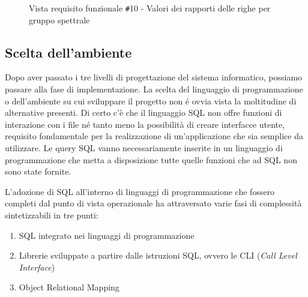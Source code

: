 \documentclass[12pt,a4paper,onecolumn,x11names]{article}
\begin{document}
\begin{figure}[h!]
		\caption{Vista requisito funzionale \texttt{\#}10 - Valori dei rapporti delle righe per gruppo spettrale}
	\end{figure}
\clearpage
\subsection{Scelta dell'ambiente}
		\begin{flushleft}
			Dopo aver passato i tre livelli di progettazione del sistema informatico, possiamo passare alla fase di implementazione. La scelta del linguaggio di programmazione o dell'ambiente su cui sviluppare il progetto non \'{e} ovvia vista la moltitudine di alternative presenti. \newline
			Di certo c'è che il linguaggio SQL non offre funzioni di interazione con i file né tanto meno la possibilità di creare interfacce utente, requisito fondamentale per la realizzazione di un'applicazione che sia semplice da utilizzare. Le query SQL vanno necessariamente inserite in un linguaggio di programmazione che metta a disposizione tutte quelle funzioni che ad SQL non sono state fornite.\newline
			
			L'adozione di SQL all'interno di linguaggi di programmazione che fossero completi dal punto di vista operazionale ha attraversato varie fasi di complessità sintetizzabili in tre punti:
		\end{flushleft}
		\begin{enumerate}
			\item SQL integrato nei linguaggi di programmazione
			\item Librerie sviluppate a partire dalle istruzioni SQL, ovvero le CLI (\textit{Call Level Interface})
			\item Object Relational Mapping
		\end{enumerate}
\end{document}
